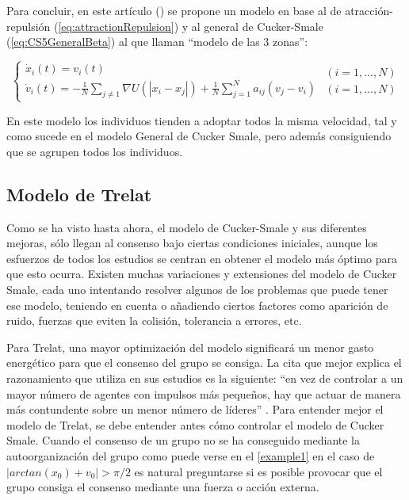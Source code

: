 Para concluir, en este artículo (\cite{canizo2010collective}) se propone un modelo en base al de atracción-repulsión (\ref{eq:attractionRepulsion}) y al general de Cucker-Smale (\ref{eq:CS5GeneralBeta}) al que llaman  ``modelo de las 3 zonas'':

\begin{equation}\label{eq:Arbor3zonesModel} 
    \left\lbrace
    \begin{array}{l}
        \dot{x}_{i}(t)=v_{i}(t) \\
        \dot{v}_{i}(t)=\displaystyle{-\frac{1}{N}\sum_{j\neq 1}\nabla U(|x_{i}-x_{j}|)+\frac{1}{N}\sum_{j=1}^{N}a_{ij}(v_{j}-v_{i})}
    \end{array}
    \begin{array}{r}
        (i = 1, ..., N) \\
        (i = 1, ..., N)
    \end{array}
    \right.
\end{equation}

En este modelo los individuos tienden a adoptar todos la misma velocidad, tal y como sucede en el modelo General de Cucker Smale, pero además consiguiendo que se agrupen todos los individuos.

\subsection{Modelo de Trelat} \label{s3_3_2}
Como se ha visto hasta ahora, el modelo de Cucker-Smale y sus diferentes mejoras, sólo llegan al consenso bajo ciertas condiciones iniciales, aunque los esfuerzos de todos los estudios se centran en obtener el modelo más óptimo para que esto ocurra. Existen muchas variaciones y extensiones del modelo de Cucker Smale, cada uno intentando resolver algunos de los problemas que puede tener ese modelo, teniendo en cuenta o añadiendo ciertos factores como aparición de ruido, fuerzas que eviten la colisión, tolerancia a errores, etc.

Para Trelat, una mayor optimización del modelo significará un menor gasto energético para que el consenso del grupo se consiga. La cita que mejor explica el razonamiento que utiliza en sus estudios es la siguiente: ``en vez de controlar a un mayor número de agentes con impulsos más pequeños, hay que actuar de manera más contundente sobre un menor número de líderes'' \cite{caponigro2015sparse}. Para entender mejor el modelo de Trelat, se debe entender antes cómo controlar el modelo de Cucker Smale. Cuando el consenso de un grupo no se ha conseguido mediante la autoorganización del grupo como puede verse en el \ref{example1} en el caso de $|arctan(x_0) + v_0| > \pi/2$ es natural
preguntarse si es posible provocar que el grupo consiga el consenso mediante una fuerza o acción externa. 


